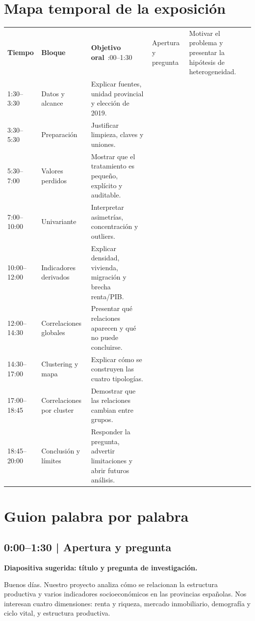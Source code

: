\documentclass[11pt,a4paper]{article}
\begin{document}
\section{Mapa temporal de la exposición}
\begin{longtable}{p{}p{}p{}}
\toprule\textbf{Tiempo} & \textbf{Bloque} & \textbf{Objetivo oral}\
\midrule{}:00--1:30 & Apertura y pregunta & Motivar el problema y presentar la hipótesis de heterogeneidad.\\
1:30--3:30 & Datos y alcance & Explicar fuentes, unidad provincial y elección de 2019.\\
3:30--5:30 & Preparación & Justificar limpieza, claves y uniones.\\
5:30--7:00 & Valores perdidos & Mostrar que el tratamiento es pequeño, explícito y auditable.\\
7:00--10:00 & Univariante & Interpretar asimetrías, concentración y outliers.\\
10:00--12:00 & Indicadores derivados & Explicar densidad, vivienda, migración y brecha renta/PIB.\\
12:00--14:30 & Correlaciones globales & Presentar qué relaciones aparecen y qué no puede concluirse.\\
14:30--17:00 & Clustering y mapa & Explicar cómo se construyen las cuatro tipologías.\\
17:00--18:45 & Correlaciones por cluster & Demostrar que las relaciones cambian entre grupos.\\
18:45--20:00 & Conclusión y límites & Responder la pregunta, advertir limitaciones y abrir futuros análisis.\\
\bottomrule
\end{longtable}

\section{Guion palabra por palabra}
\subsection{0:00--1:30 | Apertura y pregunta}
\textbf{Diapositiva sugerida: título y pregunta de investigación.}

Buenos días. Nuestro proyecto analiza cómo se relacionan la estructura productiva y varios indicadores socioeconómicos en las provincias españolas. Nos interesan cuatro dimensiones: renta y riqueza, mercado inmobiliario, demografía y ciclo vital, y estructura productiva.
\end{document}
